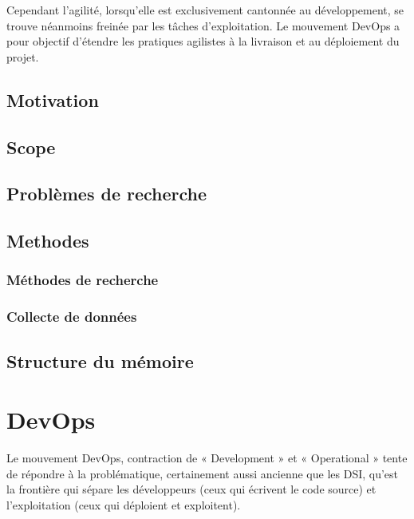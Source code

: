 \documentclass{report}
\begin{document}
  Cependant l’agilité, lorsqu’elle est exclusivement cantonnée au développement, se trouve néanmoins freinée par les tâches d’exploitation. Le mouvement DevOps a pour objectif d’étendre les pratiques agilistes à la livraison et au déploiement du projet.

    \section{Motivation}

    \section{Scope}

    \section{Problèmes de recherche}

    \section{Methodes}

      \subsection{Méthodes de recherche}

      \subsection{Collecte de données}

    \section{Structure du mémoire}

  \chapter{DevOps}
  Le mouvement DevOps, contraction de « Development » et « Operational » tente de répondre à la problématique, certainement aussi ancienne que les DSI, qu’est la frontière qui sépare les développeurs (ceux qui écrivent le code source) et l’exploitation (ceux qui déploient et exploitent).\\
\end{document}
